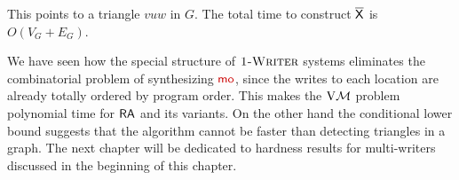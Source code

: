 This points to a triangle $v u w$ in $G$.   
The total time to construct $\overline{\mathsf{\color{black}X}}$ is $O(V_G+E_G)$. 
\smallskip

We have seen how the special structure of $\textsc{1-Writer}$ systems eliminates the combinatorial problem of synthesizing $\mo$, since the writes to each location are already totally ordered by program order. This  makes the $\mathrm{V}\mathcal{M}$ problem polynomial time for $\mathsf{RA}$ and its variants. On the other hand the conditional lower bound suggests that the algorithm cannot be faster than detecting triangles in a graph. The next chapter will be dedicated to hardness results for multi-writers discussed in the beginning of this chapter. 

